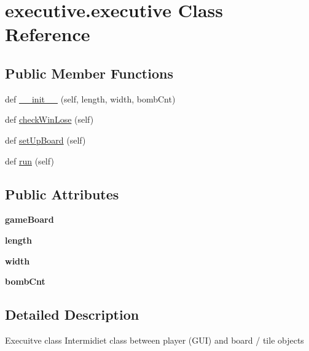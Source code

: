 \hypertarget{classexecutive_1_1executive}{}\section{executive.\+executive Class Reference}
\label{classexecutive_1_1executive}
\subsection*{Public Member Functions}
\begin{DoxyCompactItemize}
\item 
def \mbox{\hyperlink{classexecutive_1_1executive_a7456b110c146af5391ea26770144b461}{\+\_\+\+\_\+init\+\_\+\+\_\+}} (self, length, width, bomb\+Cnt)
\item 
def \mbox{\hyperlink{classexecutive_1_1executive_a944d536ab4e80df2ef4c0494d7ea9f19}{check\+Win\+Lose}} (self)
\item 
def \mbox{\hyperlink{classexecutive_1_1executive_ae2161d95542ae653323bbfb9ae0ac27b}{set\+Up\+Board}} (self)
\item 
def \mbox{\hyperlink{classexecutive_1_1executive_abe92cddf119081cac6c747858df061d7}{run}} (self)
\end{DoxyCompactItemize}
\subsection*{Public Attributes}
\begin{DoxyCompactItemize}
\item 
\mbox{\label{classexecutive_1_1executive_a2c01f1bb0156618e68f096cc8aad5f9b}} 
{\bfseries game\+Board}
\item 
\mbox{\label{classexecutive_1_1executive_afcb8b34bb0f032c2ffae4573b9a42613}} 
{\bfseries length}
\item 
\mbox{\label{classexecutive_1_1executive_a3ffae68509fd1c2b2043198df88b913c}} 
{\bfseries width}
\item 
\mbox{\label{classexecutive_1_1executive_ab749a7a52e7361de73ee03285a25e804}} 
{\bfseries bomb\+Cnt}
\end{DoxyCompactItemize}


\subsection{Detailed Description}
\begin{DoxyVerb}Execuitve class
Intermidiet class between player (GUI) and board / tile objects
\end{DoxyVerb}
 

